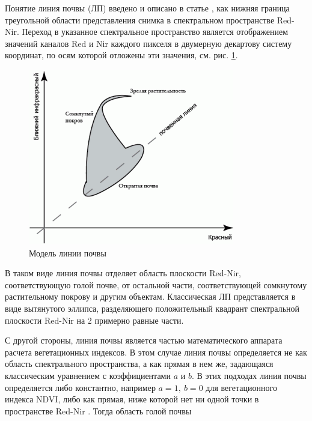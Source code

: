 \documentclass[14pt]{extarticle}
\begin{document}
\par
Понятие линия почвы (ЛП) введено и описано в статье \cite{soil-line-4}, как нижняя граница
треугольной области представления снимка в спектральном пространстве Red-Nir.
Переход в указанное спектральное пространство является отображением значений каналов Red и Nir
каждого пикселя в двумерную декартову систему координат, по осям которой отложены эти значения,
см. рис. \ref{image:soil_line_model}.
\begin{figure}[H]
\centering
\includegraphics[width=\linewidth]{imgs/soil_line_model.png}
\caption{Модель линии почвы}
\label{image:soil_line_model}
\end{figure}
\par
В таком виде линия почвы отделяет область плоскости Red-Nir, соответствующую голой почве, от
остальной части, соответствующей сомкнутому растительному покрову и другим объектам.
Классическая ЛП представляется в виде вытянутого эллипса, разделяющего положительный квадрант
спектральной плоскости Red-Nir на 2 примерно равные части.
\par
С другой стороны, линия почвы является частью математического аппарата расчета
вегетационных индексов. В этом случае линия почвы определяется не как область спектрального
пространства, а как прямая в нем же, задающаяся классическим уравнением с коэффициентами
$a$ и $b$. В этих подходах линия почвы определяется либо константно, например 
$a=1,\ b=0$ для вегетационного индекса NDVI, либо как прямая, ниже которой нет ни 
одной точки в пространстве Red-Nir \cite{soil-line-5}. Тогда область голой почвы
\end{document}

